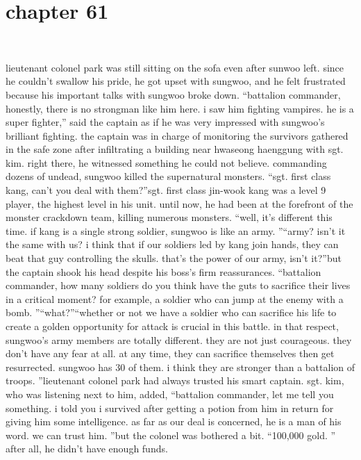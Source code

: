 \section{chapter 61}

                             




lieutenant colonel park was still sitting on the sofa even after sunwoo left.
 since he couldn’t swallow his pride, he got upset with sungwoo, and he felt frustrated because his important talks with sungwoo broke down.
“battalion commander, honestly, there is no strongman like him here.
 i saw him fighting vampires.
 he is a super fighter,” said the captain as if he was very impressed with sungwoo’s brilliant fighting.
 the captain was in charge of monitoring the survivors gathered in the safe zone after infiltrating a building near hwaseong haenggung with sgt.
 kim.
right there, he witnessed something he could not believe.
 commanding dozens of undead, sungwoo killed the supernatural monsters.
“sgt.
 first class kang, can’t you deal with them?”sgt.
 first class jin-wook kang was a level 9 player, the highest level in his unit.
until now, he had been at the forefront of the monster crackdown team, killing numerous monsters.
“well, it’s different this time.
 if kang is a single strong soldier, sungwoo is like an army.
”“army? isn’t it the same with us? i think that if our soldiers led by kang join hands, they can beat that guy controlling the skulls.
 that’s the power of our army, isn’t it?”but the captain shook his head despite his boss’s firm reassurances.
“battalion commander, how many soldiers do you think have the guts to sacrifice their lives in a critical moment? for example, a soldier who can jump at the enemy with a bomb.
”“what?”“whether or not we have a soldier who can sacrifice his life to create a golden opportunity for attack is crucial in this battle.
 in that respect, sungwoo’s army members are totally different.
 they are not just courageous.
 they don’t have any fear at all.
 at any time, they can sacrifice themselves then get resurrected.
 sungwoo has 30 of them.
 i think they are stronger than a battalion of troops.
”lieutenant colonel park had always trusted his smart captain.
sgt.
 kim, who was listening next to him, added, “battalion commander, let me tell you something.
 i told you i survived after getting a potion from him in return for giving him some intelligence.
 as far as our deal is concerned, he is a man of his word.
 we can trust him.
”but the colonel was bothered a bit.
“100,000 gold.
”
after all, he didn’t have enough funds.

